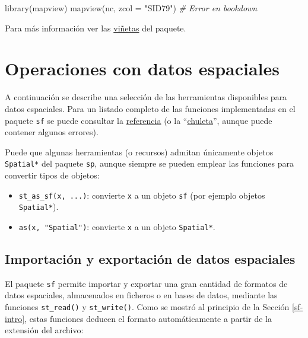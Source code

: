 \documentclass[
  spanish,
]{book}
\newenvironment{Shaded}{\begin{snugshade}}{\end{snugshade}}
\newcommand{\AttributeTok}[1]{\textcolor[rgb]{0.77,0.63,0.00}{#1}}
\newcommand{\CommentTok}[1]{\textcolor[rgb]{0.56,0.35,0.01}{\textit{#1}}}
\newcommand{\FunctionTok}[1]{\textcolor[rgb]{0.00,0.00,0.00}{#1}}
\newcommand{\NormalTok}[1]{#1}
\newcommand{\StringTok}[1]{\textcolor[rgb]{0.31,0.60,0.02}{#1}}
\providecommand{\tightlist}{%
  \setlength{\itemsep}{0pt}\setlength{\parskip}{0pt}}
\theoremstyle{break}
\begin{document}
\begin{Shaded}
\begin{Highlighting}[]
\FunctionTok{library}\NormalTok{(mapview)}
\FunctionTok{mapview}\NormalTok{(nc, }\AttributeTok{zcol =} \StringTok{"SID79"}\NormalTok{)}
\CommentTok{\# Error en bookdown}
\end{Highlighting}
\end{Shaded}

Para más información ver las \href{https://r-spatial.github.io/mapview/articles/articles/mapview_01-basics.html}{viñetas} del paquete.

\hypertarget{operaciones-datos}{%
\section{Operaciones con datos espaciales}\label{operaciones-datos}}

A continuación se describe una selección de las herramientas disponibles para datos espaciales.
Para un listado completo de las funciones implementadas en el paquete \texttt{sf} se puede consultar la \href{https://r-spatial.github.io/sf/reference/index.html}{referencia} (o la ``\href{https://github.com/rstudio/cheatsheets/blob/master/sf.pdf}{chuleta}'', aunque puede contener algunos errores).

Puede que algunas herramientas (o recursos) admitan únicamente objetos \texttt{Spatial*} del paquete \texttt{sp}, aunque siempre se pueden emplear las funciones para convertir tipos de objetos:

\begin{itemize}
\tightlist
\item
  \texttt{st\_as\_sf(x,\ ...)}: convierte \texttt{x} a un objeto \texttt{sf} (por ejemplo objetos \texttt{Spatial*}).
\item
  \texttt{as(x,\ "Spatial")}: convierte \texttt{x} a un objeto \texttt{Spatial*}.
\end{itemize}

\hypertarget{importaciuxf3n-y-exportaciuxf3n-de-datos-espaciales}{%
\subsection{Importación y exportación de datos espaciales}\label{importaciuxf3n-y-exportaciuxf3n-de-datos-espaciales}}

El paquete \texttt{sf} permite importar y exportar una gran cantidad de formatos de datos espaciales, almacenados en ficheros o en bases de datos, mediante las funciones \texttt{st\_read()} y \texttt{st\_write()}.
Como se mostró al principio de la Sección \ref{sf-intro}, estas funciones deducen el formato automáticamente a partir de la extensión del archivo:
\end{document}
